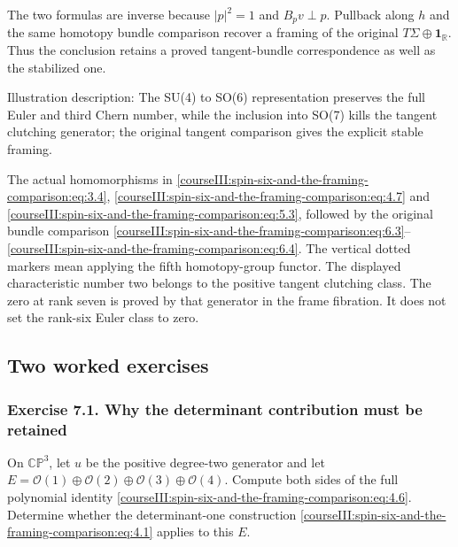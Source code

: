 The two formulas are inverse because \(|p|^2=1\) and \(B_pv\perp p\). Pullback along \(h\) and the same homotopy bundle comparison recover a framing of the original \(T\Sigma\oplus\mathbf1_{\mathbb R}\). Thus the conclusion retains a proved tangent-bundle correspondence as well as the stabilized one.

\label{courseIII:spin-six-and-the-framing-comparison:spin-six-diagram}
Illustration description: The SU(4) to SO(6) representation preserves the full Euler and third Chern number, while the inclusion into SO(7) kills the tangent clutching generator; the original tangent comparison gives the explicit stable framing.

The actual homomorphisms in \eqref{courseIII:spin-six-and-the-framing-comparison:eq:3.4}, \eqref{courseIII:spin-six-and-the-framing-comparison:eq:4.7} and \eqref{courseIII:spin-six-and-the-framing-comparison:eq:5.3}, followed by the original bundle comparison \eqref{courseIII:spin-six-and-the-framing-comparison:eq:6.3}--\eqref{courseIII:spin-six-and-the-framing-comparison:eq:6.4}. The vertical dotted markers mean applying the fifth homotopy-group functor. The displayed characteristic number two belongs to the positive tangent clutching class. The zero at rank seven is proved by that generator in the frame fibration. It does not set the rank-six Euler class to zero.

\subsection{Two worked exercises}
\label{courseIII:spin-six-and-the-framing-comparison:framing-exercises}

\label{courseIII:spin-six-and-the-framing-comparison:section-7}

\subsubsection{Exercise 7.1. Why the determinant contribution must be retained}
\label{courseIII:spin-six-and-the-framing-comparison:exercise-7.1}

\label{courseIII:spin6:7.1}

On \(\mathbb{CP}^3\), let \(u\) be the positive degree-two generator and let \(E=\mathcal O(1)\oplus\mathcal O(2)\oplus\mathcal O(3)\oplus\mathcal O(4)\). Compute both sides of the full polynomial identity \eqref{courseIII:spin-six-and-the-framing-comparison:eq:4.6}. Determine whether the determinant-one construction \eqref{courseIII:spin-six-and-the-framing-comparison:eq:4.1} applies to this \(E\).

